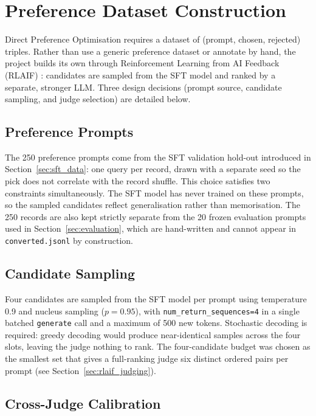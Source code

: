 \documentclass[../main.tex]{subfiles}
\begin{document}
\section{Preference Dataset Construction}
\label{sec:preference_dataset}

Direct Preference Optimisation requires a dataset of (prompt, chosen, rejected) triples. Rather than use a generic preference dataset or annotate by hand, the project builds its own through Reinforcement Learning from AI Feedback (RLAIF) \cite{bai2022constitutional}: candidates are sampled from the SFT model and ranked by a separate, stronger LLM. Three design decisions (prompt source, candidate sampling, and judge selection) are detailed below.

\subsection{Preference Prompts}
\label{sec:pref_prompts}

The 250 preference prompts come from the SFT validation hold-out introduced in Section~\ref{sec:sft_data}: one query per record, drawn with a separate seed so the pick does not correlate with the record shuffle. This choice satisfies two constraints simultaneously. The SFT model has never trained on these prompts, so the sampled candidates reflect generalisation rather than memorisation. The 250 records are also kept strictly separate from the 20 frozen evaluation prompts used in Section~\ref{sec:evaluation}, which are hand-written and cannot appear in \texttt{converted.jsonl} by construction.

\subsection{Candidate Sampling}
\label{sec:candidate_sampling}

Four candidates are sampled from the SFT model per prompt using temperature 0.9 and nucleus sampling ($p = 0.95$), with \texttt{num\_return\_sequences=4} in a single batched \texttt{generate} call and a maximum of 500 new tokens. Stochastic decoding is required: greedy decoding would produce near-identical samples across the four slots, leaving the judge nothing to rank. The four-candidate budget was chosen as the smallest set that gives a full-ranking judge six distinct ordered pairs per prompt (see Section~\ref{sec:rlaif_judging}).

\subsection{Cross-Judge Calibration}
\label{sec:calibration}
\end{document}
